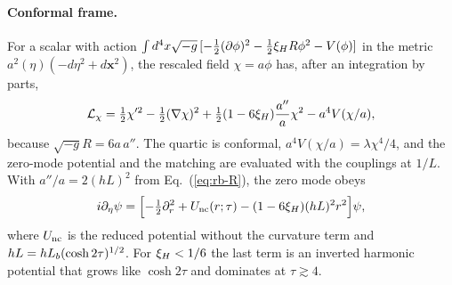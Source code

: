 \paragraph{Conformal frame.}
For a scalar with action $\int d^4x\sqrt{-g}\,[-\frac12(\partial\phi)^2-\frac12\xi_H R\phi^2-V(\phi)]$ in the metric $a^2(\eta)(-d\eta^2+d\bm x^2)$, the rescaled field $\chi=a\phi$ has, after an integration by parts,
\begin{equation}
\mathcal L_\chi=\tfrac12\chi'^2-\tfrac12(\nabla\chi)^2+\tfrac12(1-6\xi_H)\frac{a''}{a}\chi^2-a^4V(\chi/a),
\label{eq:rb-Lchi}
\end{equation}
because $\sqrt{-g}R=6a\,a''$.
The quartic is conformal, $a^4V(\chi/a)=\lambda\chi^4/4$, and the zero-mode potential and the matching are evaluated with the couplings at $1/L$.
With $a''/a=2(hL)^2$ from Eq.~(\ref{eq:rb-R}), the zero mode obeys
\begin{equation}
i\partial_\eta\psi=\Bigl[-\tfrac12\partial_r^2+U_{\rm nc}(r;\tau)-(1-6\xi_H)(hL)^2r^2\Bigr]\psi,
\label{eq:rb-conformal}
\end{equation}
where $U_{\rm nc}$ is the reduced potential without the curvature term and $hL=hL_b(\cosh2\tau)^{1/2}$.
For $\xi_H<1/6$ the last term is an inverted harmonic potential that grows like $\cosh2\tau$ and dominates at $\tau\gtrsim4$.

